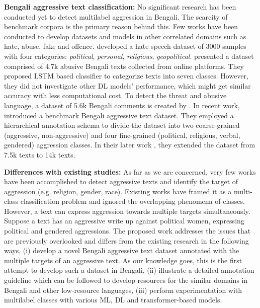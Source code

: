 \documentclass[11pt]{article}
\begin{document}
\textbf{Bengali aggressive text classification:} No significant research has been conducted yet to detect multilabel aggression in Bengali. The scarcity of benchmark corpora is the primary reason behind this. Few works have been conducted to develop datasets and models in other correlated domains such as hate, abuse, fake and offence. \citet{karim2021deephateexplainer} developed a hate speech dataset of 3000 samples with four categories: \textit{political}, \textit{personal}, \textit{religious}, \textit{geopolitical}. \citet{8843606} presented a dataset comprised of 4.7k abusive Bengali texts collected from online platforms. They proposed LSTM based classifier to categorize texts into seven classes. However, they did not investigate other DL models' performance, which might get similar accuracy with less computational cost. To detect the threat and abusive language, a dataset of 5.6k Bengali comments is created by \citet{8934609}. In recent work, \citet{sharif2021constraint} introduced a benchmark Bengali aggressive text dataset. They employed a hierarchical annotation schema to divide the dataset into two coarse-grained (aggressive, non-aggressive) and four fine-grained (political, religious, verbal, gendered) aggression classes. In their later work \cite{SHARIF2021}, they extended the dataset from 7.5k texts to 14k texts.

\textbf{Differences with existing studies:} As far as we are concerned, very few works have been accomplished to detect aggressive texts and identify the target of aggression (e.g. religion, gender, race). Existing works \cite{SHARIF2021,zampieri-etal-2019-predicting,kumar-etal-2018-aggression} have framed it as a multi-class classification problem and ignored the overlapping phenomena of classes. However, a text can express aggression towards multiple targets simultaneously. Suppose a text has an aggressive write up against political women, expressing political and gendered aggressions. The proposed work addresses the issues that are previously overlooked and differs from the existing research in the following ways, (i) develop a novel Bengali aggressive text dataset annotated with the multiple targets of an aggressive text. As our knowledge goes, this is the first attempt to develop such a dataset in Bengali, (ii) illustrate a detailed annotation guideline which can be followed to develop resources for the similar domains in Bengali and other low-resource languages, (iii) perform experimentation with multilabel classes with various ML, DL and transformer-based models.
\end{document}
